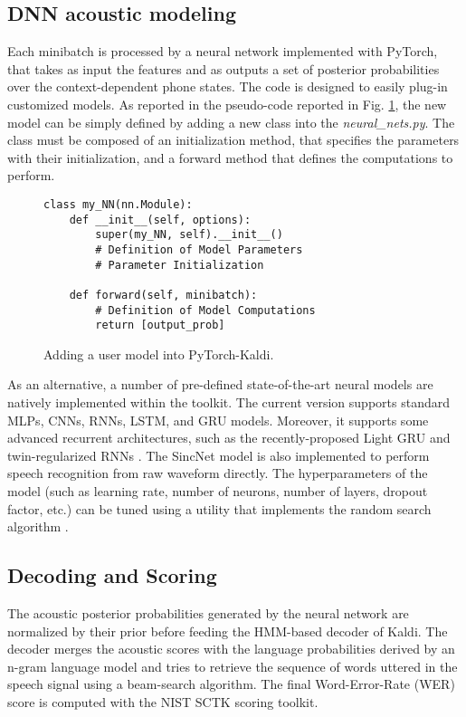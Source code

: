 \documentclass{article}
\begin{document}
\subsection{DNN acoustic modeling}
Each minibatch is processed by a neural network implemented with PyTorch, that takes as input the features and as outputs a set of posterior probabilities over the context-dependent phone states. The code is designed to easily plug-in customized models. As reported in the pseudo-code reported in Fig. \ref{fig:code}, the new model can be simply defined by adding a new class into the \textit{neural\_nets.py}. The class must be composed of an initialization method, that specifies the parameters with their initialization, and a forward method that defines the computations to perform. 

\begin{figure}[t!]
\caption{Adding a user model into PyTorch-Kaldi.}
\lstset{language=Python}
\lstset{frame=lines}
\lstset{basicstyle=\footnotesize}
\begin{lstlisting}
class my_NN(nn.Module):
    def __init__(self, options):
        super(my_NN, self).__init__()
        # Definition of Model Parameters
        # Parameter Initialization
        
    def forward(self, minibatch):
        # Definition of Model Computations
        return [output_prob]
\end{lstlisting}
\label{fig:code}
\end{figure}

As an alternative, a number of pre-defined state-of-the-art neural models are natively implemented within the toolkit. The current version supports standard MLPs, CNNs, RNNs, LSTM, and GRU models. Moreover, it supports some advanced recurrent architectures, such as the recently-proposed Light GRU \cite{li_gru} and twin-regularized RNNs \cite{twin_reg}. The SincNet model \cite{SincNet,sincnet_irasl} is also implemented to perform speech recognition from raw waveform directly. The hyperparameters of the model (such as learning rate, number of neurons, number of layers, dropout factor, etc.) can be tuned using a utility that implements the random search algorithm \cite{random_search}.

\subsection{Decoding and Scoring}
The acoustic posterior probabilities generated by the neural network are normalized by their prior before feeding the HMM-based decoder of Kaldi. The decoder merges the acoustic scores with the language probabilities derived by an n-gram language model and tries to retrieve the sequence of words uttered in the speech signal using a beam-search algorithm. The final Word-Error-Rate (WER) score is computed with the NIST SCTK scoring toolkit.
\end{document}
